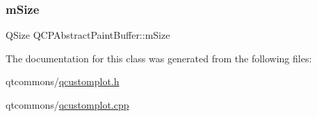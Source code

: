 \mbox{\label{class_q_c_p_abstract_paint_buffer_ae246c426222bfa18d5e8797fab73e3ce}} 
\subsubsection{\texorpdfstring{mSize}{mSize}}
{\footnotesize\ttfamily Q\+Size Q\+C\+P\+Abstract\+Paint\+Buffer\+::m\+Size\hspace{0.3cm}{\ttfamily [protected]}}



The documentation for this class was generated from the following files\+:\begin{DoxyCompactItemize}
\item 
qtcommons/\mbox{\hyperlink{qcustomplot_8h}{qcustomplot.\+h}}\item 
qtcommons/\mbox{\hyperlink{qcustomplot_8cpp}{qcustomplot.\+cpp}}\end{DoxyCompactItemize}

